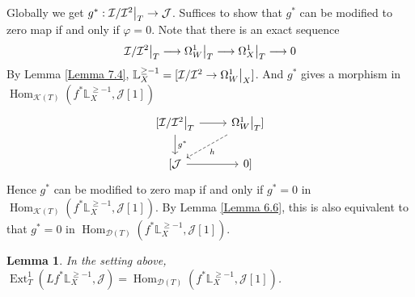 \documentclass{ctexart}
\newtheorem{lemma}{Lemma}[section]
\renewcommand{\hom}{\operatorname{Hom}}
\newcommand{\ext}{\operatorname{Ext}}
\begin{document}
Globally we get $g^{\ast}: \mathcal{I}/\mathcal{I}^{2}\big{|}_{T} \rightarrow \mathcal{J}$.
Suffices to show that $g^{\ast}$ can be modified to zero map if and only if $\varphi = 0$.
Note that there is an exact sequence
\begin{equation}
    \mathcal{I}/\mathcal{I}^{2}\big{|}_{T} \longrightarrow \Omega_{W}^{1}\big{|}_{T} \longrightarrow \Omega_{X}^{1}\big{|}_{T} \longrightarrow 0
\end{equation}
By Lemma \ref{Lemma 7.4}, $\mathbb{L}_{X}^{\ge -1} = [\mathcal{I}/\mathcal{I}^{2} \rightarrow \Omega_{W}^{1}\big{|}_{X}]$.
And $g^{\ast}$ gives a morphism in $\hom_{\mathcal{K}(T)}(f^{\ast}\mathbb{L}_{X}^{\ge -1}, \mathcal{J}[1])$
\begin{equation}
    \begin{tikzcd}
        {[\mathcal{I}/\mathcal{I}^{2}}\big{|}_{T} \arrow[r] \arrow[d, "g^{\ast}"] &
        {\Omega_{W}^{1}\big{|}_{T}]} \arrow[dl, dashrightarrow, "h"] \\
        {[\mathcal{J}} \arrow[r] &
        {0]}
    \end{tikzcd}
\end{equation}
Hence $g^{\ast}$ can be modified to zero map if and only if $g^{\ast} = 0$ in $\hom_{\mathcal{K}(T)}(f^{\ast}\mathbb{L}_{X}^{\ge -1}, \mathcal{J}[1])$.
By Lemma \ref{Lemma 6.6}, this is also equivalent to that $g^{\ast} = 0$ in $\hom_{\mathcal{D}(T)}(f^{\ast}\mathbb{L}_{X}^{\ge -1}, \mathcal{J}[1])$.
\begin{lemma}
    In the setting above, $\ext_{T}^{1}(Lf^{\ast}\mathbb{L}_{X}^{\ge -1}, \mathcal{J}) = \hom_{\mathcal{D}(T)}(f^{\ast}\mathbb{L}_{X}^{\ge -1}, \mathcal{J}[1])$.
    \label{Lemma 7.6}
\end{lemma}
\end{document}
